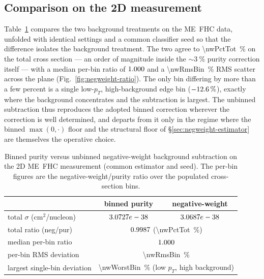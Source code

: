 \subsection{Comparison on the 2D measurement}
\label{sec:negweight-2d}

Table~\ref{tab:negweight} compares the two background treatments on the
ME~FHC data, unfolded with identical settings and a common classifier
seed so that the difference isolates the background treatment. The two agree to
\SI{\nwPctTot}{\percent} on the total cross section --- an order of magnitude
inside the ${\sim}\SI{3}{\percent}$ purity correction itself --- with a median
per-bin ratio of $1.000$ and a \SI{\nwRmsBin}{\percent} RMS scatter
across the plane (Fig.~\ref{fig:negweight-ratio}).
The only bin differing by more than a few percent is a single low-$p_T$,
high-background edge bin ($\SI{-12.6}{\percent}$), exactly where the
background concentrates and the subtraction is largest. The unbinned
subtraction thus reproduces the adopted binned correction wherever the
correction is well determined, and departs from it only in the regime where the
binned $\max(0,\cdot)$ floor and the structural floor of
\S\ref{sec:negweight-estimator} are themselves the operative choice.

\begin{table}[t]
  \centering
  \caption{Binned purity versus unbinned negative-weight background
    subtraction on the 2D ME~FHC measurement (common estimator and seed).
    The per-bin figures are the negative-weight/purity ratio over the
    populated cross-section bins.}
  \label{tab:negweight}
  \begin{tabular}{lcc}
    \hline\hline
    & binned purity & negative-weight \\
    \hline
    total $\sigma$ (cm$^2$/nucleon) & $3.0727e-38$ & $3.0687e-38$ \\
    total ratio (neg/pur)           & \multicolumn{2}{c}{$0.9987$ (\SI{\nwPctTot}{\percent})} \\
    median per-bin ratio            & \multicolumn{2}{c}{$1.000$} \\
    per-bin RMS deviation           & \multicolumn{2}{c}{\SI{\nwRmsBin}{\percent}} \\
    largest single-bin deviation    & \multicolumn{2}{c}{\SI{\nwWorstBin}{\percent} (low $p_T$, high background)} \\
    \hline\hline
  \end{tabular}
\end{table}

